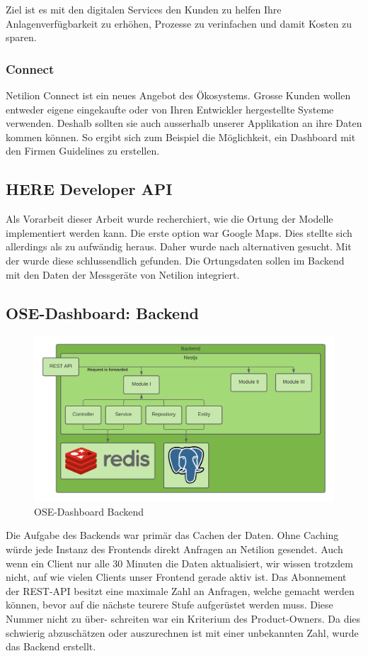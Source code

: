 Ziel ist es mit den digitalen Services den Kunden zu helfen Ihre Anlagenverfügbarkeit zu erhöhen, Prozesse zu verinfachen und damit Kosten zu sparen.
\subsubsection{Connect}
Netilion Connect ist ein neues Angebot des Ökosystems. Grosse Kunden wollen entweder eigene eingekaufte oder von Ihren Entwickler hergestellte Systeme verwenden. Deshalb sollten sie auch ausserhalb unserer Applikation an ihre Daten kommen können. So ergibt sich zum Beispiel die Möglichkeit, ein Dashboard mit den Firmen Guidelines zu erstellen.
\subsection{HERE Developer API}
Als Vorarbeit dieser Arbeit wurde recherchiert, wie die Ortung der Modelle implementiert werden kann. Die erste option war Google Maps. Dies stellte sich allerdings als zu aufwändig heraus. Daher wurde nach alternativen gesucht. Mit der  wurde diese schlussendlich gefunden.
\newline
Die Ortungsdaten sollen im Backend mit den Daten der Messgeräte von Netilion integriert.
\subsection{OSE-Dashboard: Backend} \label{arch-backend}
\begin{figure}[H]
  \centering
  \includegraphics[width=.95\linewidth]{./images/backend.png}
  \caption[{Diagramm OSE-Dashboard Backend von Jonas Schultheiss}]{OSE-Dashboard Backend}
  \label{fig:backend}
\end{figure}
Die Aufgabe des Backends war primär das Cachen der Daten. Ohne Caching würde jede Instanz des Frontends direkt Anfragen an Netilion gesendet. Auch wenn ein Client nur alle 30 Minuten die Daten aktualisiert, wir wissen trotzdem nicht, auf wie vielen Clients unser Frontend gerade aktiv ist. Das Abonnement der REST-API besitzt eine maximale Zahl an Anfragen, welche gemacht werden können, bevor auf die nächste teurere Stufe aufgerüstet werden muss. Diese Nummer nicht zu über- schreiten war ein Kriterium des Product-Owners. Da dies schwierig abzuschätzen oder auszurechnen ist mit einer unbekannten Zahl, wurde das Backend erstellt.


